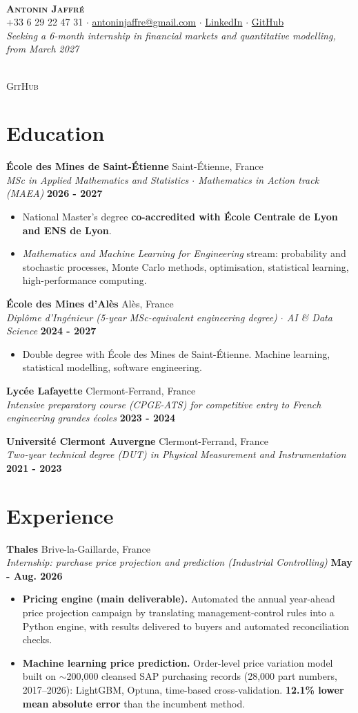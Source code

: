 \documentclass[a4paper,10pt]{article}
\newcommand{\makeheader}[4]{
    \noindent
    \begin{minipage}[c]{0.09\textwidth}~\end{minipage}%
    \hfill
    \begin{minipage}[c]{0.74\textwidth}
        \centering
        {\huge \textbf{\textsc{#1}}} \\ \vspace{6pt}
        #2 \\ \vspace{4pt}
        \small{\textit{#3}}
    \end{minipage}%
    \hfill
    \begin{minipage}[c]{0.15\textwidth}
        \raggedleft
        \qrcode[height=2.1cm]{#4} \\ \vspace{2pt}
        \tiny\textsc{GitHub}
    \end{minipage}
    \vspace{4pt}
}
\newcommand{\cventry}[4]{
    \vspace{2pt}
    \noindent \textbf{#1} \hfill #2 \\
    \noindent \textit{#3} \hfill \textbf{#4}
}
\newenvironment{cvbullets}{
    \begin{itemize}[itemsep=1.5pt, topsep=2pt, leftmargin=1.1em, label=\tiny$\bullet$]
}{
    \end{itemize} \vspace{1pt}
}
\begin{document}
\makeheader{Antonin Jaffré}
    {+33 6 29 22 47 31 $\cdot$ \href{mailto:antoninjaffre@gmail.com}{antoninjaffre@gmail.com} $\cdot$ \href{https://www.linkedin.com/in/antonin-jaffr\%C3\%A9}{LinkedIn} $\cdot$ \href{https://github.com/antojfr}{GitHub}}
    {Seeking a 6-month internship in financial markets and quantitative modelling, from March 2027}
    {https://github.com/antojfr}

\section{Education}

\cventry{École des Mines de Saint-Étienne}{Saint-Étienne, France}{MSc in Applied Mathematics and Statistics $\cdot$ Mathematics in Action track (MAEA)}{2026 - 2027}
\begin{cvbullets}
    \item National Master's degree \textbf{co-accredited with École Centrale de Lyon and ENS de Lyon}.
    \item \textit{Mathematics and Machine Learning for Engineering} stream: probability and stochastic processes, Monte Carlo methods, optimisation, statistical learning, high-performance computing.
\end{cvbullets}

\cventry{École des Mines d'Alès}{Alès, France}{Diplôme d'Ingénieur (5-year MSc-equivalent engineering degree) $\cdot$ AI \& Data Science}{2024 - 2027}
\begin{cvbullets}
    \item Double degree with École des Mines de Saint-Étienne. Machine learning, statistical modelling, software engineering.
\end{cvbullets}

\cventry{Lycée Lafayette}{Clermont-Ferrand, France}{Intensive preparatory course (CPGE-ATS) for competitive entry to French engineering grandes écoles}{2023 - 2024}

\cventry{Université Clermont Auvergne}{Clermont-Ferrand, France}{Two-year technical degree (DUT) in Physical Measurement and Instrumentation}{2021 - 2023}

\section{Experience}

\cventry{Thales}{Brive-la-Gaillarde, France}{Internship: purchase price projection and prediction (Industrial Controlling)}{May - Aug. 2026}
\begin{cvbullets}
    \item \textbf{Pricing engine (main deliverable).} Automated the annual year-ahead price projection campaign by translating management-control rules into a Python engine, with results delivered to buyers and automated reconciliation checks.
    \item \textbf{Machine learning price prediction.} Order-level price variation model built on $\sim$200,000 cleansed SAP purchasing records (28,000 part numbers, 2017--2026): LightGBM, Optuna, time-based cross-validation. \textbf{12.1\% lower mean absolute error} than the incumbent method.
\end{cvbullets}
\end{document}
